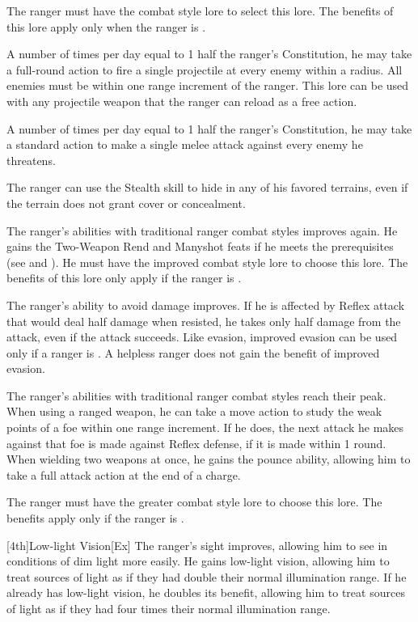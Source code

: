 The ranger must have the combat style lore to select this lore.
The benefits of this lore apply only when the ranger is \unencumbered.

A number of times per day equal to 1 \add half the ranger's Constitution, he may take a full-round action to fire a single projectile at every enemy within a \areamed radius.
All enemies must be within one range increment of the ranger.
This lore can be used with any projectile weapon that the ranger can reload as a free action.

A number of times per day equal to 1 \add half the ranger's Constitution, he may take a standard action to make a single melee attack against every enemy he threatens.

\label{Camouflage}
The ranger can use the Stealth skill to hide in any of his favored terrains, even if the terrain does not grant cover or concealment.

The ranger's abilities with traditional ranger combat styles improves again.
He gains the Two-Weapon Rend and Manyshot feats if he meets the prerequisites (see  and ).
He must have the improved combat style lore to choose this lore.
The benefits of this lore only apply if the ranger is \unencumbered.

The ranger's ability to avoid damage improves.
If he is affected by Reflex attack that would deal half damage when resisted, he takes only half damage from the attack, even if the attack succeeds.
Like evasion, improved evasion can be used only if a ranger is \unencumbered.
A helpless ranger does not gain the benefit of improved evasion.

The ranger's abilities with traditional ranger combat styles reach their peak.
When using a ranged weapon, he can take a move action to study the weak points of a foe within one range increment.
If he does, the next attack he makes against that foe is made against Reflex defense, if it is made within 1 round.
When wielding two weapons at once, he gains the pounce ability, allowing him to take a full attack action at the end of a charge.

The ranger must have the greater combat style lore to choose this lore.
The benefits apply only if the ranger is \unencumbered.

[4th]{Low-light Vision}[Ex]
The ranger's sight improves, allowing him to see in conditions of dim light more easily.
He gains low-light vision, allowing him to treat sources of light as if they had double their normal illumination range.
If he already has low-light vision, he doubles its benefit, allowing him to treat sources of light as if they had four times their normal illumination range.

